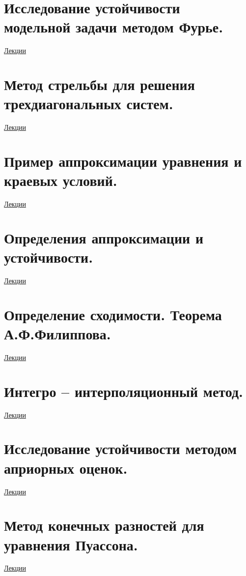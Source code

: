 \documentclass[specialist, subf, href, colorlinks=true, 12pt, times, mtpro, final]{disser}
\theoremstyle{definition}
\begin{document}
\section {Исследование устойчивости модельной задачи методом Фурье.}
	\hyperlink {lects.111}{Лекции}\\

\section {Метод стрельбы для решения трехдиагональных систем.}
	\hyperlink {lects.112}{Лекции}\\

\section {Пример аппроксимации уравнения и краевых условий.}
	\hyperlink {lects.115}{Лекции}\\

\section {Определения аппроксимации и устойчивости.}
	\hyperlink {lects.118}{Лекции}\\

\section {Определение сходимости. Теорема А.Ф.Филиппова.}
	\hyperlink {lects.120}{Лекции}\\

\section {Интегро -- интерполяционный метод.}
	\hyperlink {lects.121}{Лекции}\\

\section {Исследование устойчивости методом априорных оценок.}
	\hyperlink {lects.125}{Лекции}\\

\section {Метод конечных разностей для уравнения Пуассона.}
	\hyperlink {lects.128}{Лекции}\\
\end{document}
